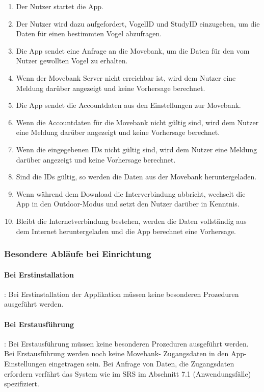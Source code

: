 \documentclass[12pt]{article} %
\begin{document}
\begin{enumerate}[label={\arabic*.}]
\item Der Nutzer startet die App.
\item Der Nutzer wird dazu aufgefordert, VogelID und StudyID einzugeben, um die Daten für einen bestimmten Vogel abzufragen.
\item Die App sendet eine Anfrage an die Movebank, um die Daten für den vom Nutzer gewollten Vogel zu erhalten.
\item Wenn der Movebank Server nicht erreichbar ist, wird dem Nutzer eine Meldung darüber angezeigt und keine Vorhersage berechnet.
\item Die App sendet die Accountdaten aus den Einstellungen zur Movebank.
\item Wenn die Accountdaten für die Movebank nicht gültig sind, wird dem Nutzer eine Meldung darüber angezeigt und keine Vorhersage berechnet.
\item Wenn die eingegebenen IDs nicht gültig sind, wird dem Nutzer eine Meldung darüber angezeigt und keine Vorhersage berechnet.
\item Sind die IDs gültig, so werden die Daten aus der Movebank heruntergeladen.
\item Wenn während dem Download die Interverbindung abbricht, wechselt die App in den Outdoor-Modus und setzt den Nutzer darüber in Kenntnis.
\item Bleibt die Internetverbindung bestehen, werden die Daten vollständig aus dem Internet heruntergeladen und die App berechnet eine Vorhersage.
\end{enumerate}


\subsubsection{Besondere Abläufe bei Einrichtung}

\paragraph{Bei Erstinstallation}: Bei Erstinstallation der Applikation
müssen keine besonderen Prozeduren ausgeführt werden.

\paragraph{Bei Erstausführung}: Bei Erstausführung müssen keine besonderen
Prozeduren ausgeführt werden. Bei Erstausführung werden noch keine Movebank-
Zugangsdaten in den App-Einstellungen eingetragen sein. Bei Anfrage von Daten,
die Zugangsdaten erfordern verfährt das System wie im SRS im Abschnitt 7.1 (Anwendungsfälle) spezifiziert.
\end{document}
